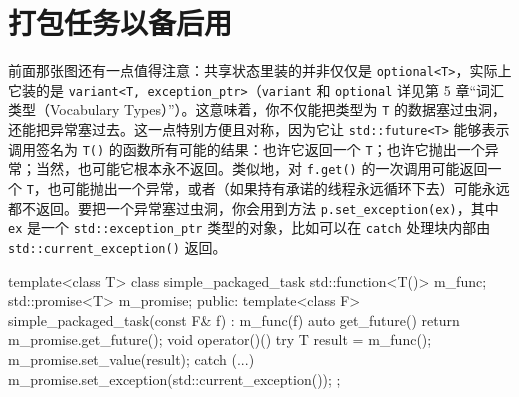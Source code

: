 \section{打包任务以备后用}

前面那张图还有一点值得注意：共享状态里装的并非仅仅是 \texttt{optional<\allowbreak{}T>\allowbreak{}}，实际上它装的是 \texttt{variant<\allowbreak{}T,\allowbreak{} exception\_\allowbreak{}ptr>\allowbreak{}}（\texttt{variant} 和 \texttt{optional} 详见第 5 章“词汇类型（Vocabulary Types）”）。这意味着，你不仅能把类型为 \texttt{T} 的数据塞过虫洞，还能把异常塞过去。这一点特别方便且对称，因为它让 \texttt{std::\allowbreak{}future<\allowbreak{}T>\allowbreak{}} 能够表示调用签名为 \texttt{T(\allowbreak{})\allowbreak{}} 的函数所有可能的结果：也许它返回一个 \texttt{T}；也许它抛出一个异常；当然，也可能它根本永不返回。类似地，对 \texttt{f.\allowbreak{}get(\allowbreak{})\allowbreak{}} 的一次调用可能返回一个 \texttt{T}，也可能抛出一个异常，或者（如果持有承诺的线程永远循环下去）可能永远都不返回。要把一个异常塞过虫洞，你会用到方法 \texttt{p.\allowbreak{}set\_\allowbreak{}exception(\allowbreak{}ex)\allowbreak{}}，其中 \texttt{ex} 是一个 \texttt{std::\allowbreak{}exception\_\allowbreak{}ptr} 类型的对象，比如可以在 \texttt{catch} 处理块内部由 \texttt{std::\allowbreak{}current\_\allowbreak{}exception(\allowbreak{})\allowbreak{}} 返回。

\begin{codebox}[cpp]
    template<class T>
    class simple_packaged_task {
      std::function<T()> m_func;
      std::promise<T> m_promise;
    public:
      template<class F>
      simple_packaged_task(const F& f) : m_func(f) {}
      auto get_future() { return m_promise.get_future(); }
      void operator()() {
        try {
          T result = m_func();
          m_promise.set_value(result);
        } catch (...) {
          m_promise.set_exception(std::current_exception());
        }
      }
    };
\end{codebox}

